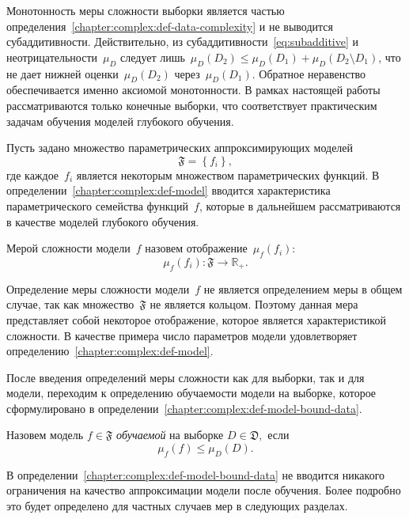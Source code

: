 \begin{remark}
    Монотонность меры сложности выборки является частью определения~\ref{chapter:complex:def-data-complexity} и не выводится субаддитивности. Действительно, из субаддитивности~\eqref{eq:subadditive} и неотрицательности~$\mu_D$ следует лишь~$\mu_D(D_2)\leq\mu_D(D_1)+\mu_D(D_2\setminus D_1)$, что не дает нижней оценки~$\mu_D(D_2)$ через~$\mu_D(D_1)$. Обратное неравенство обеспечивается именно аксиомой монотонности. В рамках настоящей работы рассматриваются только конечные выборки, что соответствует практическим задачам обучения моделей глубокого обучения.
\end{remark}

Пусть задано множество параметрических аппроксимирующих моделей
\[
    \mathfrak{F} = \left\{f_i\right\},
\]
где каждое~$f_i$ является некоторым множеством параметрических функций. В определении~\ref{chapter:complex:def-model} вводится характеристика параметрического семейства функций~$f$, которые в дальнейшем рассматриваются в качестве моделей глубокого обучения.
\begin{definition}\label{chapter:complex:def-model}
    Мерой сложности модели~$f$ назовем отображение~$\mu_f(f_i)$:
    \[
        \mu_f(f_i) : \mathfrak{F} \to \mathbb{R}_+.
    \]
\end{definition}

Определение меры сложности модели~$f$ не является определением меры в общем случае, так как множество~$\mathfrak{F}$ не является кольцом. Поэтому данная мера представляет собой некоторое отображение, которое является характеристикой сложности.
В качестве примера число параметров модели удовлетворяет определению~\ref{chapter:complex:def-model}.

После введения определений меры сложности как для выборки, так и для модели, переходим к определению обучаемости модели на выборке, которое сформулировано в определении~\ref{chapter:complex:def-model-bound-data}.

\begin{definition}\label{chapter:complex:def-model-bound-data}
    Назовем модель $f\in\mathfrak{F}$ \textit{обучаемой} на выборке $D\in\mathfrak{D},$ если
    \[
        \mu_f(f)\leq \mu_D(D).
    \]
\end{definition}

В определении~\ref{chapter:complex:def-model-bound-data} не вводится никакого ограничения на качество аппроксимации модели после обучения. Более подробно это будет определено для частных случаев мер в следующих разделах.

